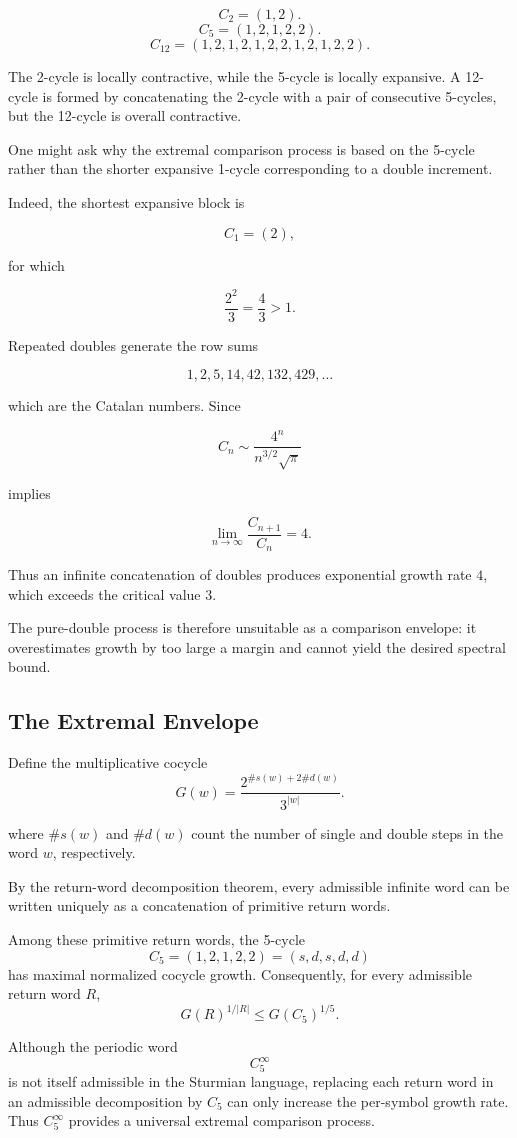 \documentclass[12pt, oneside]{article}
\numberwithin{equation}{section}
\theoremstyle{definition}
\theoremstyle{plain}
\theoremstyle{remark}
\begin{document}
\[
C_2=(1,2).
\]
\[
C_5=(1,2,1,2,2).
\]
\[
C_{12}=(1,2,1,2,1,2,2,1,2,1,2,2).
\]

The 2-cycle is locally contractive, while the 5-cycle is locally expansive. A 12-cycle
is formed by concatenating the 2-cycle with a pair of consecutive 5-cycles, but the 
12-cycle is overall contractive.

One might ask why the extremal comparison process is based on the
5-cycle rather than the shorter expansive 1-cycle corresponding to a
double increment.

Indeed, the shortest expansive block is

\[
C_1=(2),
\]

for which

\[
\frac{2^2}{3} = \frac43 > 1.
\]

Repeated doubles generate the row sums

\[
1,2,5,14,42,132,429,\ldots
\]

which are the Catalan numbers.
Since

\[
C_n
\sim
\frac{4^n}{n^{3/2}\sqrt{\pi}}
\]

implies

\[
\lim_{n\to\infty}
\frac{C_{n+1}}{C_n}
=
4.
\]

Thus an infinite concatenation of doubles produces exponential growth
rate \(4\), which exceeds the critical value \(3\).

The pure-double process is therefore unsuitable as a comparison
envelope: it overestimates growth by too large a margin and cannot
yield the desired spectral bound.

\subsection{The Extremal Envelope}

Define the multiplicative cocycle
\[
G(w)
=
\frac{2^{\#s(w)+2\#d(w)}}{3^{|w|}}.
\]

where \(\#s(w)\) and \(\#d(w)\) count the number of single and double steps
in the word \(w\), respectively.

By the return-word decomposition theorem, every admissible infinite word
can be written uniquely as a concatenation of primitive return words.

Among these primitive return words, the 5-cycle
\[
C_5=(1,2,1,2,2)=(s,d,s,d,d)
\]
has maximal normalized cocycle growth. Consequently,
for every admissible return word $R$,
\[
G(R)^{1/|R|}
\le
G(C_5)^{1/5}.
\]

Although the periodic word
\[
C_5^\infty
\]
is not itself admissible in the Sturmian language, replacing each return
word in an admissible decomposition by $C_5$ can only increase the
per-symbol growth rate. Thus $C_5^\infty$ provides a universal extremal
comparison process.
\end{document}

